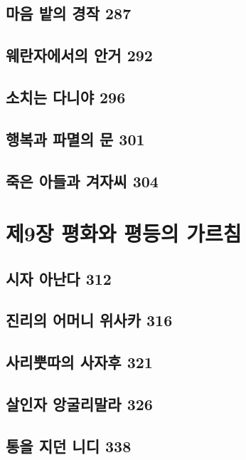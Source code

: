 \documentclass[12pt, a4paper, oneside]{book}
\let\stdsection\section
\renewcommand\section{\newpage\stdsection}
\begin{document}
	\section{마음 밭의 경작 287 }

	\section{웨란자에서의 안거 292 }

	\section{소치는 다니야 296 }

	\section{행복과 파멸의 문 301 }

	\section{죽은 아들과 겨자씨 304}




	\chapter{제9장 평화와 평등의 가르침}
	\noptcrule
	\parttoc				


	\section{시자 아난다 312 }

	\section{진리의 어머니 위사카 316 }

	\section{사리뿟따의 사자후 321 }

	\section{살인자 앙굴리말라 326 }

	\section{통을 지던 니디 338 }
\end{document}
